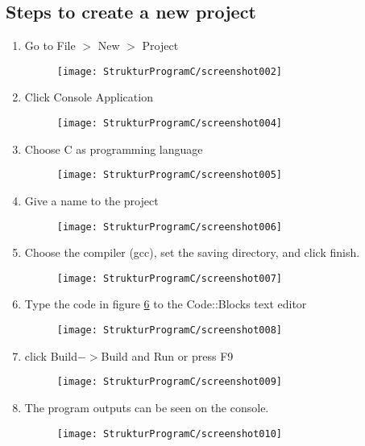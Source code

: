 \subsection{Steps to create a new project}
\begin{enumerate}
\item Go to File $>$ New $>$ Project 
	\begin{figure}[H]
		\centering
		\texttt{[image: StrukturProgramC/screenshot002]}
		\caption{}
		\label{fig:screenshot002}
	\end{figure}
\item Click Console Application
\begin{figure}[H]
	\centering
	\texttt{[image: StrukturProgramC/screenshot004]}
	\caption{}
	\label{fig:screenshot004}
\end{figure}
\item Choose C as programming language
\begin{figure}[H]
	\centering
	\texttt{[image: StrukturProgramC/screenshot005]}
	\caption{}
	\label{fig:screenshot005}
\end{figure}
\item Give a name to the project
\begin{figure}[H]
	\centering
	\texttt{[image: StrukturProgramC/screenshot006]}
	\caption{}
	\label{fig:screenshot006}
\end{figure}
\item  Choose the compiler (gcc), set the saving directory, and click finish.
\begin{figure}[H]
	\centering
	\texttt{[image: StrukturProgramC/screenshot007]}
	\caption{}
	\label{fig:screenshot007}
\end{figure}
\item Type the code in figure \ref{fig:screenshot008} to the Code::Blocks text editor
\begin{figure}[H]
	\centering
	\texttt{[image: StrukturProgramC/screenshot008]}
	\caption{}
	\label{fig:screenshot008}
\end{figure}
\item click Build$->$Build and Run or press F9
\begin{figure}[H]
	\centering
	\texttt{[image: StrukturProgramC/screenshot009]}
	\caption{}
	\label{fig:screenshot009}
\end{figure}
\item The program outputs can be seen on the console.
\begin{figure}[H]
	\centering
	\texttt{[image: StrukturProgramC/screenshot010]}
	\caption{}
	\label{fig:screenshot010}
\end{figure}
\end{enumerate}

